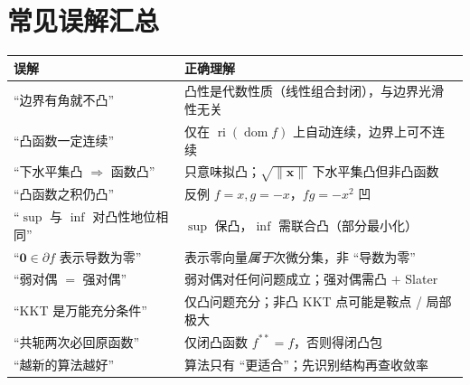 \section*{常见误解汇总}
\begin{table}[H]\centering\small
\label{tab:cvx-misconceptions}
\begin{tabular}{ll}
\toprule
误解 & 正确理解 \\
\midrule
“边界有角就不凸” & 凸性是代数性质（线性组合封闭），与边界光滑性无关 \\
“凸函数一定连续” & 仅在 $\operatorname{ri}(\operatorname{dom}f)$ 上自动连续，边界上可不连续 \\
“下水平集凸 $\Rightarrow$ 函数凸” & 只意味拟凸；$\sqrt{\|\mathbf x\|}$ 下水平集凸但非凸函数 \\
“凸函数之积仍凸” & 反例 $f=x,g=-x$，$fg=-x^2$ 凹 \\
“$\sup$ 与 $\inf$ 对凸性地位相同” & $\sup$ 保凸，$\inf$ 需联合凸（部分最小化） \\
“$\mathbf 0\in\partial f$ 表示导数为零” & 表示零向量\emph{属于}次微分集，非 “导数为零” \\
“弱对偶 $=$ 强对偶” & 弱对偶对任何问题成立；强对偶需凸 $+$ Slater \\
“KKT 是万能充分条件” & 仅凸问题充分；非凸 KKT 点可能是鞍点 / 局部极大 \\
“共轭两次必回原函数” & 仅闭凸函数 $f^{\ast\ast}=f$，否则得闭凸包 \\
“越新的算法越好” & 算法只有 “更适合”；先识别结构再查收敛率 \\
\bottomrule
\end{tabular}
\end{table}

